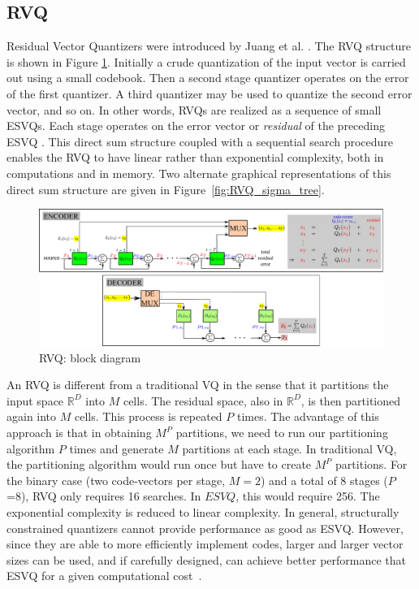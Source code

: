 \begin{Body}
\subsection{RVQ}
Residual Vector Quantizers were introduced by Juang et al. \cite{1982_CNF_SpeechRVQ_JuangGray}.  The RVQ structure is shown in Figure \ref{fig:RVQ_block_diagram}.  Initially a crude quantization of the input vector is carried out using a small codebook.  Then a second stage quantizer operates on the error of the first quantizer.  A third quantizer may be used to quantize the second error vector, and so on.  In other words, RVQs are realized as a sequence of small ESVQs.  Each stage operates on the error vector or \emph{residual} of the preceding ESVQ \cite{1991_CNF_DesignPerformanceRVQ_Frost}.  This direct sum structure coupled with a sequential search procedure enables the RVQ to have linear rather than exponential complexity, both in computations and in memory.  Two alternate graphical representations of this direct sum structure are given in Figure~\ref{fig:RVQ_sigma_tree}.

\begin{figure}				
	\includegraphics[width=1\textwidth]{thesis/RVQ_blockDiagram.pdf}
	\caption{RVQ: block diagram}
	\label{fig:RVQ_block_diagram}
\end{figure}

An RVQ is different from a traditional VQ in the sense that it partitions the input space $\mathbb{R}^D$ into $M$ cells.  The residual space, also in $\mathbb{R}^D$, is then partitioned again into $M$ cells.  This process is repeated $P$ times.  The advantage of this approach is that in obtaining $M^P$ partitions, we need to run our partitioning algorithm $P$ times and generate $M$ partitions at each stage.  In traditional VQ, the partitioning algorithm would run once but have to create $M^P$ partitions.  For the binary case (two code-vectors per stage, $M=2$) and a total of 8 stages ($P$=8), RVQ only requires 16 searches.  In $ESVQ$, this would require 256.  The exponential complexity is reduced to linear complexity.  In general, structurally constrained quantizers cannot provide performance as good as ESVQ.  However, since they are able to more efficiently implement codes, larger and larger vector sizes can be used, and if carefully designed, can achieve better performance that ESVQ for a given computational cost~\cite{1996_JNL_AdvancesRVQ_Barnes}.


\end{Body}
